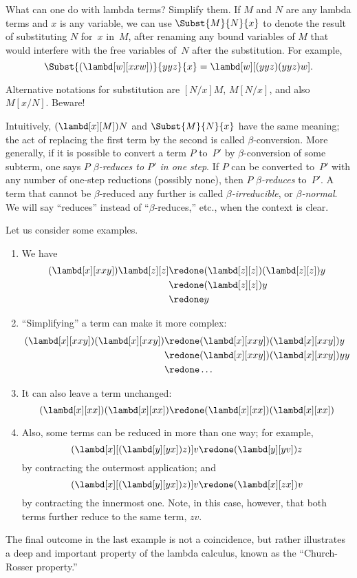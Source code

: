 \documentclass[../../../include/open-logic-section]{subfiles}
\begin{document}

What can one do with lambda terms? Simplify them. If $M$ and $N$ are
any lambda terms and $x$ is any variable, we can use $\Subst{M}{N}{x}$ to
denote the result of substituting $N$ for~$x$ in~$M$, after renaming
any bound variables of $M$ that would interfere with the free
variables of~$N$ after the substitution. For example,
\[
\Subst{(\lambd[w][xxw])}{yyz}{x} = \lambd[w][(yyz)(yyz)w].
\]

\begin{digress}
Alternative notations for substitution are $[N/x]M$, $M[N/x]$, and
also $M[x/N]$. Beware!
\end{digress}

Intuitively, $(\lambd[x][M])N$ and $\Subst{M}{N}{x}$ have the same
meaning; the act of replacing the first term by the second is called
$\beta$-conversion. More generally, if it is possible to convert a
term $P$ to~$P'$ by $\beta$-conversion of some subterm, one says
\emph{$P$ $\beta$-reduces to $P'$ in one step}. If $P$ can be
converted to~$P'$ with any number of one-step reductions (possibly
none), then $P$ \emph{$\beta$-reduces} to~$P'$. A term that cannot be
$\beta$-reduced any further is called \emph{$\beta$-irreducible}, or
\emph{$\beta$-normal}. We will say ``reduces'' instead of
``$\beta$-reduces,'' etc., when the context is clear.

Let us consider some examples.
\begin{enumerate}
\item We have
\begin{align*}
(\lambd[x][xxy]) \lambd[z][z] & \redone (\lambd[z][z])(\lambd[z][z]) y \\
& \redone (\lambd[z][z]) y \\
& \redone y
\end{align*}
\item ``Simplifying'' a term can make it more complex:
\begin{align*}
(\lambd[x][xxy])(\lambd[x][xxy]) & \redone (\lambd[x][xxy])(\lambd[x][xxy])y \\
& \redone (\lambd[x][xxy])(\lambd[x][xxy])yy \\
& \redone \dots
\end{align*}
\item It can also leave a term unchanged:
\[
(\lambd[x][xx])(\lambd[x][xx]) \redone (\lambd[x][xx])(\lambd[x][xx])
\]
\item Also, some terms can be reduced in more than one way; for
  example,
\[
(\lambd[x][(\lambd[y][yx]) z)] v \redone (\lambd[y][yv]) z
\]
by contracting the outermost application; and
\[
(\lambd[x][(\lambd[y][yx]) z)] v \redone (\lambd[x][zx]) v
\]
by contracting the innermost one. Note, in this case, however, that
both terms further reduce to the same term, $zv$.
\end{enumerate}

The final outcome in the last example is not a coincidence, but rather
illustrates a deep and important property of the lambda calculus, known as the
``Church-Rosser property.''
\end{document}
